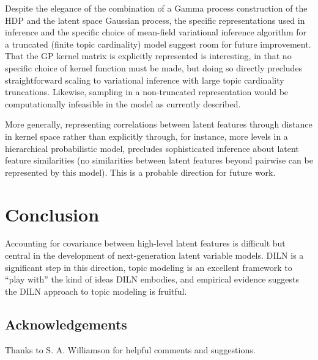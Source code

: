 \documentclass[twoside]{article}
\begin{document}
Despite the elegance of the combination of a Gamma process construction of the HDP and the latent space Gaussian process, the specific representations used in inference and the specific choice of mean-field variational inference algorithm for a truncated (finite topic cardinality) model suggest room for future improvement.  That the GP kernel matrix is explicitly represented is interesting, in that no specific choice of kernel function must be made, but doing so directly precludes straightforward scaling to variational inference with large topic cardinality truncations.  Likewise, sampling in a non-truncated representation would be computationally infeasible in the model as currently described.

More generally, representing correlations between latent features through distance in kernel space rather than explicitly through, for instance, more levels in a hierarchical probabilistic model, precludes sophisticated inference about latent feature similarities (no similarities between latent features beyond pairwise can be represented by this model).  This is a probable direction for future work.



\section{Conclusion}

Accounting for covariance between high-level latent features is difficult but central in the development of next-generation latent variable models.  DILN is a significant step in this direction, topic modeling is an excellent framework to ``play with'' the kind of ideas DILN embodies, and empirical evidence suggests the DILN approach to topic modeling is fruitful.




\subsection{Acknowledgements}
Thanks to S. A. Williamson for helpful comments and suggestions.

\begin{small}

 
%
\end{small}
\end{document}

